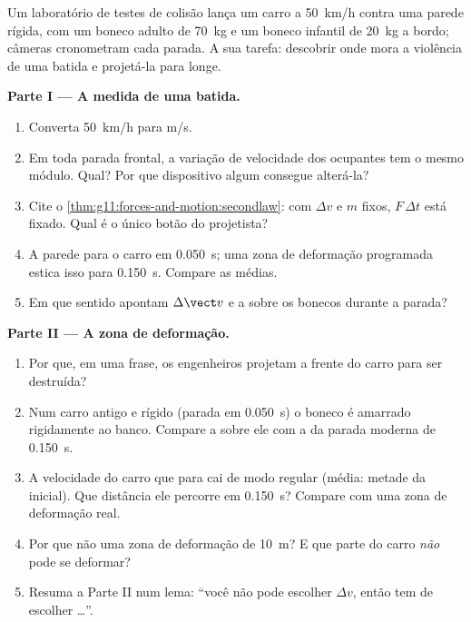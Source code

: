 \begin{problem}
\label{pb:g11:forces-and-motion:1}
Um laboratório de testes de colisão lança um carro a \qty{50}{km/h}
contra uma parede rígida, com um boneco adulto de \qty{70}{kg} e um
boneco infantil de \qty{20}{kg} a bordo; câmeras cronometram cada
parada. A sua tarefa: descobrir onde mora a violência de uma batida e
projetá-la para longe.

\medskip
\noindent\textbf{Parte I --- A medida de uma batida.}
\begin{enumerate}
  \item Converta \qty{50}{km/h} para \unit{m/s}.
  \item Em toda parada frontal, a variação de velocidade dos ocupantes
        tem o mesmo módulo. Qual? Por que dispositivo algum consegue
        alterá-la?
  \item Cite o \cref{thm:g11:forces-and-motion:secondlaw}: com $\Delta v$
        e $m$ fixos, $F\,\Delta t$ está fixado. Qual é o único botão do
        projetista?
  \item A parede para o carro em \qty{0.050}{s}; uma zona de deformação
        programada estica isso para \qty{0.150}{s}. Compare as 
        médias.
  \item Em que sentido apontam $\Delta \vect v$ e a 
        sobre os bonecos durante a parada?
\end{enumerate}

\medskip
\noindent\textbf{Parte II --- A zona de deformação.}
\begin{enumerate}[resume]
  \item Por que, em uma frase, os engenheiros projetam a frente do carro
        para ser destruída?
  \item Num carro antigo e rígido (parada em \qty{0.050}{s}) o boneco é
        amarrado rigidamente ao banco. Compare a  sobre ele com a da
        parada moderna de \qty{0.150}{s}.
  \item A velocidade do carro que para cai de modo regular (média: metade
        da inicial). Que distância ele percorre em \qty{0.150}{s}? Compare
        com uma zona de deformação real.
  \item Por que não uma zona de deformação de \qty{10}{m}? E que parte do
        carro \emph{não} pode se deformar?
  \item Resuma a Parte II num lema: ``você não pode escolher $\Delta v$,
        então tem de escolher \dots''.
\end{enumerate}


\end{problem}
